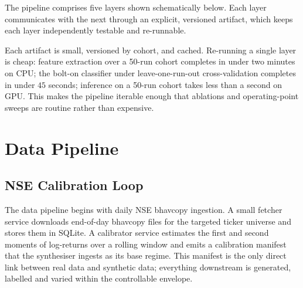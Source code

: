 \documentclass[10pt,twocolumn,letterpaper]{article}
\begin{document}
The pipeline comprises five layers shown schematically below. Each
layer communicates with the next through an explicit, versioned
artifact, which keeps each layer independently testable and
re-runnable.

\smallskip
\noindent
{}
\smallskip

Each artifact is small, versioned by cohort, and cached. Re-running a
single layer is cheap: feature extraction over a 50-run cohort
completes in under two minutes on CPU; the bolt-on classifier under
leave-one-run-out cross-validation completes in under \(45\) seconds;
inference on a 50-run cohort takes less than a second on GPU. This
makes the pipeline iterable enough that ablations and operating-point
sweeps are routine rather than expensive.

\section{Data Pipeline}
\label{sec:data}

\subsection{NSE Calibration Loop}
The data pipeline begins with daily NSE bhavcopy ingestion. A small
fetcher service downloads end-of-day bhavcopy files for the targeted
ticker universe and stores them in SQLite. A calibrator service
estimates the first and second moments of log-returns over a rolling
window and emits a calibration manifest that the synthesiser ingests as
its base regime. This manifest is the only direct link between real
data and synthetic data; everything downstream is generated, labelled
and varied within the controllable envelope.
\end{document}
